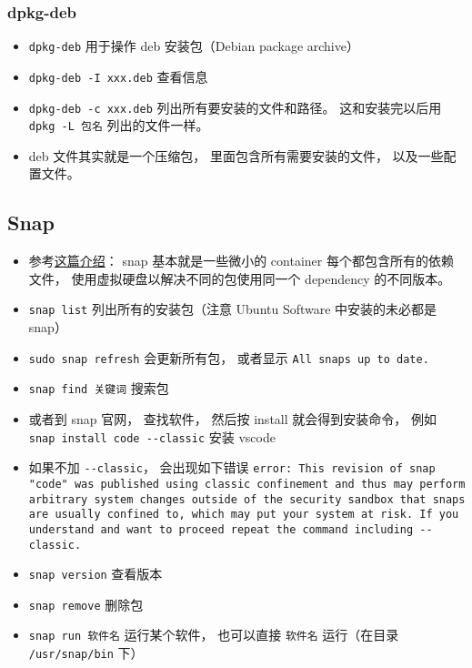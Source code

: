 \subsubsection{dpkg-deb}
\begin{itemize}
\item \verb`dpkg-deb` 用于操作 deb 安装包（Debian package archive）
\item \verb`dpkg-deb -I xxx.deb` 查看信息
\item \verb`dpkg-deb -c xxx.deb` 列出所有要安装的文件和路径。 这和安装完以后用 \verb`dpkg -L 包名` 列出的文件一样。
\item deb 文件其实就是一个压缩包， 里面包含所有需要安装的文件， 以及一些配置文件。
\end{itemize}


\subsection{Snap}
\begin{itemize}
\item 参考\href{https://www.howtogeek.com/660193/how-to-work-with-snap-packages-on-linux/}{这篇介绍}： snap 基本就是一些微小的 container 每个都包含所有的依赖文件， 使用虚拟硬盘以解决不同的包使用同一个 dependency 的不同版本。
\item \verb`snap list` 列出所有的安装包（注意 Ubuntu Software 中安装的未必都是 snap）
\item \verb`sudo snap refresh` 会更新所有包， 或者显示 \verb`All snaps up to date.`
\item \verb`snap find 关键词` 搜索包
\item 或者到 snap 官网， 查找软件， 然后按 install 就会得到安装命令， 例如 \verb`snap install code --classic` 安装 vscode
\item 如果不加 \verb`--classic`， 会出现如下错误 \verb`error: This revision of snap "code" was published using classic confinement and thus may perform arbitrary system changes outside of the security sandbox that snaps are usually confined to, which may put your system at risk. If you understand and want to proceed repeat the command including --classic.`
\item \verb`snap version` 查看版本
\item \verb`snap remove` 删除包
\item \verb`snap run 软件名` 运行某个软件， 也可以直接 \verb`软件名` 运行（在目录 \verb`/usr/snap/bin` 下）
\end{itemize}

